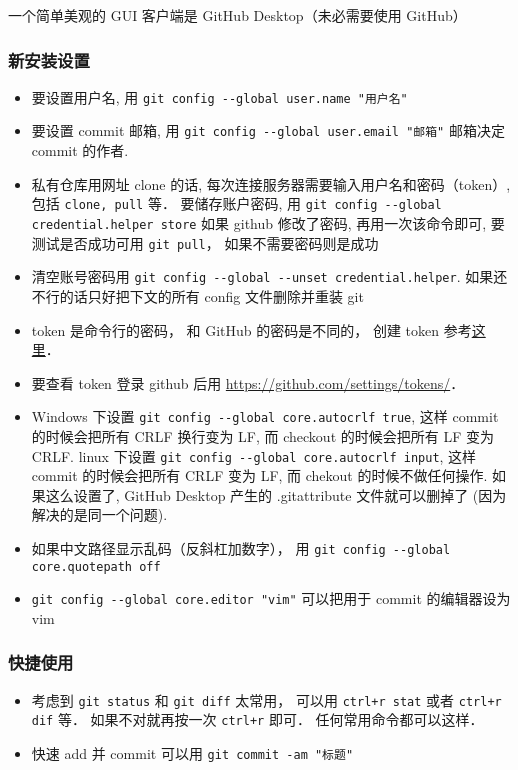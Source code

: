 

一个简单美观的 GUI 客户端是 GitHub Desktop（未必需要使用 GitHub）

\subsubsection{新安装设置}
\begin{itemize}
\item 要设置用户名, 用 \verb|git config --global user.name "用户名"|
\item 要设置 commit 邮箱, 用 \verb|git config --global user.email "邮箱"|  邮箱决定 commit 的作者.
\item 私有仓库用网址 clone 的话, 每次连接服务器需要输入用户名和密码（token）, 包括 \verb|clone, pull| 等． 要储存账户密码, 用 \verb|git config --global credential.helper store| 如果 github 修改了密码, 再用一次该命令即可, 要测试是否成功可用 \verb|git pull|， 如果不需要密码则是成功
\item 清空账号密码用 \verb|git config --global --unset credential.helper|. 如果还不行的话只好把下文的所有 config 文件删除并重装 git
\item token 是命令行的密码， 和 GitHub 的密码是不同的， 创建 token 参考\href{https://docs.github.com/en/github/authenticating-to-github/keeping-your-account-and-data-secure/creating-a-personal-access-token#creating-a-token}{这里}．
\item 要查看 token 登录 github 后用 \href{https://github.com/settings/tokens/}{https://github.com/settings/tokens/}．
\item Windows 下设置 \verb|git config --global core.autocrlf true|, 这样 commit 的时候会把所有 CRLF 换行变为 LF, 而 checkout 的时候会把所有 LF 变为 CRLF. linux 下设置 \verb|git config --global core.autocrlf input|, 这样 commit 的时候会把所有 CRLF 变为 LF, 而 chekout 的时候不做任何操作. 如果这么设置了, GitHub Desktop 产生的 .gitattribute 文件就可以删掉了 (因为解决的是同一个问题).
\item 如果中文路径显示乱码（反斜杠加数字）， 用 \verb|git config --global core.quotepath off|
\item \verb|git config --global core.editor "vim"| 可以把用于 commit 的编辑器设为 vim
\end{itemize}

\subsubsection{快捷使用}
\begin{itemize}
\item 考虑到 \verb|git status| 和 \verb|git diff| 太常用， 可以用 \verb|ctrl+r stat| 或者 \verb|ctrl+r dif| 等． 如果不对就再按一次 \verb|ctrl+r| 即可． 任何常用命令都可以这样．
\item 快速 add 并 commit 可以用 \verb|git commit -am "标题"|
\end{itemize}


